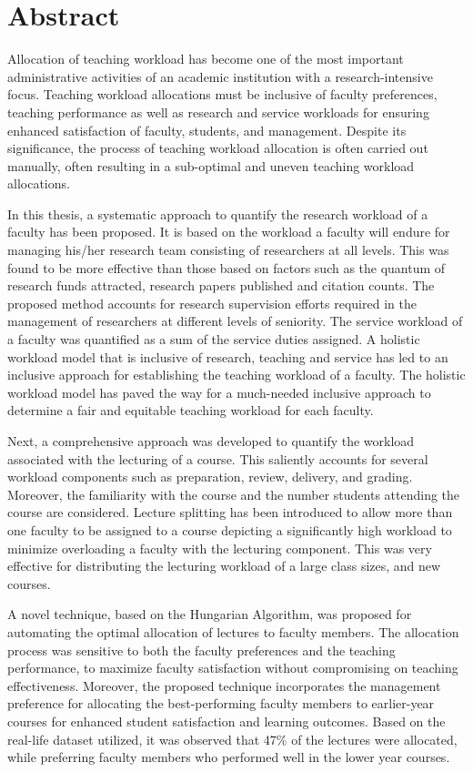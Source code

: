 \chapter*{Abstract}

Allocation of teaching workload has become one of the most important administrative activities of an academic institution with a research-intensive focus. Teaching workload allocations must be inclusive of faculty preferences, teaching performance as well as research and service workloads for ensuring enhanced satisfaction of faculty, students, and management. Despite its significance, the process of teaching workload allocation is often carried out manually, often resulting in a sub-optimal and uneven teaching workload allocations.

In this thesis, a systematic approach to quantify the research workload of a faculty has been proposed. It is based on the workload a faculty will endure for managing his/her research team consisting of researchers at all levels. This was found to be more effective than those based on factors such as the quantum of research funds attracted, research papers published and citation counts. The proposed method accounts for research supervision efforts required in the management of researchers at different levels of seniority. The service workload of a faculty was quantified as a sum of the service duties assigned. A holistic workload model that is inclusive of research, teaching and service has led to an inclusive approach for establishing the teaching workload of a faculty. The holistic workload model has paved the way for a much-needed inclusive approach to determine a fair and equitable teaching workload for each faculty.

Next, a comprehensive approach was developed to quantify the workload associated with the lecturing of a course. This saliently accounts for several workload components such as preparation, review, delivery, and grading. Moreover, the familiarity with the course and the number students attending the course are considered. Lecture splitting has been introduced to allow more than one faculty to be assigned to a course depicting a significantly high workload to minimize overloading a faculty with the lecturing component. This was very effective for distributing the lecturing workload of a large class sizes, and new courses.

A novel technique, based on the Hungarian Algorithm, was proposed for automating the optimal allocation of lectures to faculty members. The allocation process was sensitive to both the faculty preferences and the teaching performance, to maximize faculty satisfaction without compromising on teaching effectiveness. Moreover, the proposed technique incorporates the management preference for allocating the best-performing faculty members to earlier-year courses for enhanced student satisfaction and learning outcomes. Based on the real-life dataset utilized, it was observed that 47\% of the lectures were allocated, while preferring faculty members who performed well in the lower year courses.

